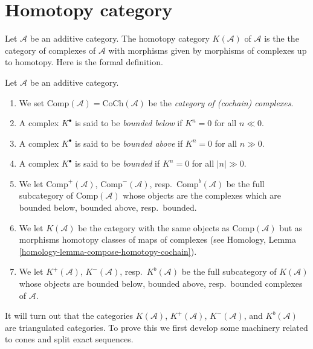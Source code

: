\section{Homotopy category}
\label{section-homotopy}

\noindent
Let $\mathcal{A}$ be an additive category. The homotopy category
$K(\mathcal{A})$ of $\mathcal{A}$ is the the category of complexes of
$\mathcal{A}$ with morphisms given by morphisms of complexes up to homotopy.
Here is the formal definition.

\begin{definition}
\label{definition-complexes-notation}
Let $\mathcal{A}$ be an additive category.
\begin{enumerate}
\item We set $\text{Comp}(\mathcal{A}) = \text{CoCh}(\mathcal{A})$
be the {\it category of (cochain) complexes}.
\item A complex $K^\bullet$ is said to be
{\it bounded below} if $K^n = 0$ for all $n \ll 0$.
\item A complex $K^\bullet$ is said to be
{\it bounded above} if $K^n = 0$ for all $n \gg 0$.
\item A complex $K^\bullet$ is said to be
{\it bounded} if $K^n = 0$ for all $|n| \gg 0$.
\item We let
$\text{Comp}^{+}(\mathcal{A})$, $\text{Comp}^{-}(\mathcal{A})$,
resp.\ $\text{Comp}^b(\mathcal{A})$ be the full subcategory
of $\text{Comp}(\mathcal{A})$ whose objects are the complexes
which are bounded below, bounded above, resp.\ bounded.
\item We let $K(\mathcal{A})$ be the category with the same objects
as $\text{Comp}(\mathcal{A})$ but as morphisms homotopy classes of
maps of complexes (see
Homology, Lemma \ref{homology-lemma-compose-homotopy-cochain}).
\item We let $K^{+}(\mathcal{A})$, $K^{-}(\mathcal{A})$,
resp.\ $K^b(\mathcal{A})$ be the full subcategory of $K(\mathcal{A})$
whose objects are bounded below, bounded above, resp.\ bounded
complexes of $\mathcal{A}$.
\end{enumerate}
\end{definition}

\noindent
It will turn out that the categories $K(\mathcal{A})$,
$K^{+}(\mathcal{A})$, $K^{-}(\mathcal{A})$, and $K^b(\mathcal{A})$
are triangulated categories. To prove this we first develop
some machinery related to cones and split exact sequences.




